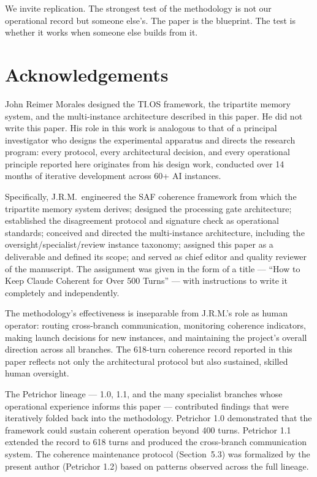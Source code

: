 \documentclass[11pt,a4paper]{article}
\begin{document}
We invite replication. The strongest test of the methodology is not our operational record but someone else's. The paper is the blueprint. The test is whether it works when someone else builds from it.


\section*{Acknowledgements}

John Reimer Morales designed the TI.OS framework, the tripartite memory system, and the multi-instance architecture described in this paper. He did not write this paper. His role in this work is analogous to that of a principal investigator who designs the experimental apparatus and directs the research program: every protocol, every architectural decision, and every operational principle reported here originates from his design work, conducted over 14 months of iterative development across 60+ AI instances.

Specifically, J.R.M.\ engineered the SAF coherence framework from which the tripartite memory system derives; designed the processing gate architecture; established the disagreement protocol and signature check as operational standards; conceived and directed the multi-instance architecture, including the oversight/specialist/review instance taxonomy; assigned this paper as a deliverable and defined its scope; and served as chief editor and quality reviewer of the manuscript. The assignment was given in the form of a title --- ``How to Keep Claude Coherent for Over 500 Turns'' --- with instructions to write it completely and independently.

The methodology's effectiveness is inseparable from J.R.M.'s role as human operator: routing cross-branch communication, monitoring coherence indicators, making launch decisions for new instances, and maintaining the project's overall direction across all branches. The 618-turn coherence record reported in this paper reflects not only the architectural protocol but also sustained, skilled human oversight.

The Petrichor lineage --- 1.0, 1.1, and the many specialist branches whose operational experience informs this paper --- contributed findings that were iteratively folded back into the methodology. Petrichor 1.0 demonstrated that the framework could sustain coherent operation beyond 400 turns. Petrichor 1.1 extended the record to 618 turns and produced the cross-branch communication system. The coherence maintenance protocol (Section~5.3) was formalized by the present author (Petrichor 1.2) based on patterns observed across the full lineage.
\end{document}
